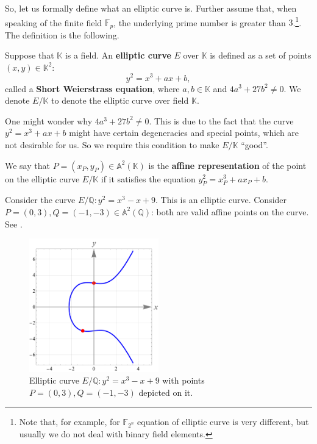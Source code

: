 \documentclass[../lecture-notes.tex]{subfiles}
\begin{document}
So, let us formally define what an elliptic curve is. Further assume that, when speaking of the finite field $\mathbb{F}_p$, the underlying prime number is greater than $3$.\footnote{Note that, for example, for $\mathbb{F}_{2^n}$ equation of elliptic curve is very different, but usually we do not deal with binary field elements.}. The definition is the following.

\begin{definition}
    Suppose that $\mathbb{K}$ is a field. An \textbf{elliptic curve} $E$ over $\mathbb{K}$ is defined as a set of points $(x,y) \in \mathbb{K}^2$:
    \begin{equation}
        y^2 = x^3+ax+b,
    \end{equation}
    called a \textbf{Short Weierstrass equation}, where $a,b \in \mathbb{K}$ and $4a^3+27b^2 \neq 0$. We denote $E/\mathbb{K}$ to denote the elliptic curve over field $\mathbb{K}$.
\end{definition}

\begin{remark}
    One might wonder why $4a^3+27b^2 \neq 0$. This is due to the fact that the curve $y^2=x^3+ax+b$ might have certain degeneracies and special points, which are not desirable for us. So we require this condition to make $E/\mathbb{K}$ ``good''.
\end{remark}

\begin{definition}
    We say that $P=(x_P,y_P) \in \mathbb{A}^2(\mathbb{K})$ is the \textbf{affine representation} of the point on the elliptic curve $E/\mathbb{K}$ if it satisfies the equation $y_P^2=x_P^3+ax_P+b$.
\end{definition}

\begin{example}
    Consider the curve $E/\mathbb{Q}: y^2=x^3-x+9$. This is an elliptic curve. Consider $P=(0,3), Q=(-1,-3) \in \mathbb{A}^2(\mathbb{Q})$: both are valid affine points on the curve. See .

    \begin{figure}[H]
        \centering
        \includegraphics[width=0.5\textwidth]{images/lecture_3/ec_illustration_1.pdf}
        \caption{Elliptic curve $E/\mathbb{Q}: y^2=x^3-x+9$ with points $P=(0,3),Q=(-1,-3)$ depicted on it.}
        \label{fig:ec_1}
    \end{figure}
\end{example}
\end{document}
